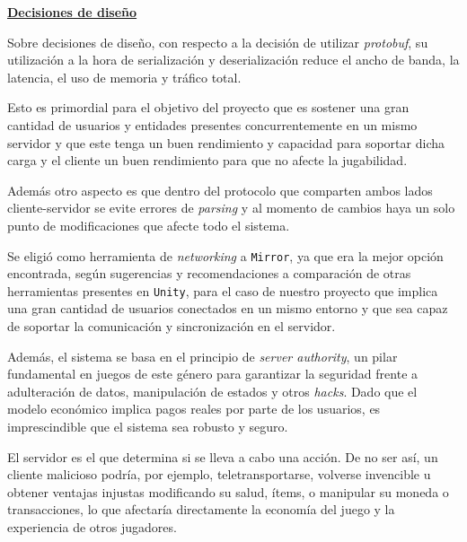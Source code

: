 \vspace{0.35cm}

\textbf{\underline{Decisiones de diseño}}

\vspace{0.15cm}

Sobre decisiones de diseño, con respecto a la decisión de utilizar \textit{protobuf}, su utilización a la hora 
de serialización y deserialización reduce el ancho de banda, la latencia, el uso de memoria y tráfico total.

Esto es primordial para el objetivo del proyecto que es sostener una gran cantidad de usuarios y entidades 
presentes concurrentemente en un mismo servidor y que este tenga un buen rendimiento y capacidad para soportar 
dicha carga y el cliente un buen rendimiento para que no afecte la jugabilidad.

Además otro aspecto es que dentro del protocolo que comparten ambos lados cliente-servidor se evite errores de 
\textit{parsing} y al momento de cambios haya un solo punto de modificaciones que afecte todo el sistema.

\vspace{0.25cm}

Se eligió como herramienta de \textit{networking} a \texttt{Mirror}, ya que era la mejor opción encontrada, según sugerencias 
y recomendaciones a comparación de otras herramientas presentes en \texttt{Unity}, 
para el caso de nuestro proyecto que implica una gran cantidad de usuarios conectados en un mismo entorno y 
que sea capaz de soportar la comunicación y sincronización en el servidor.

Además, el sistema se basa en el principio de \textit{server authority}, un pilar fundamental en juegos de este 
género para garantizar la seguridad frente a adulteración de datos, manipulación de estados y otros \textit{hacks}. 
Dado que el modelo económico implica pagos reales por parte de los usuarios, es imprescindible que el sistema sea 
robusto y seguro.

El servidor es el que determina si se lleva a cabo una acción. De no ser así, un cliente 
malicioso podría, por ejemplo, teletransportarse, volverse invencible u obtener ventajas injustas modificando su salud, 
ítems, o manipular su moneda o transacciones, lo que afectaría directamente la economía del juego y la experiencia de otros 
jugadores.
